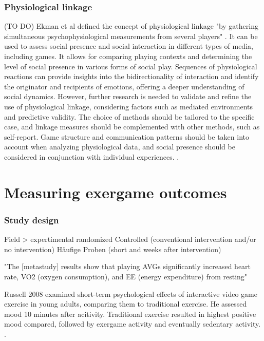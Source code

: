 \subsection{Physiological linkage} (TO DO)
Ekman et al defined the concept of physiological linkage "by gathering simultaneous psychophysiological measurements from several players" \cite{ekman2012social}. It can be used to assess social presence and social interaction in different types of media, including games. It allows for comparing playing contexts and determining the level of social presence in various forms of social play. Sequences of physiological reactions can provide insights into the bidirectionality of interaction and identify the originator and recipients of emotions, offering a deeper understanding of social dynamics. However, further research is needed to validate and refine the use of physiological linkage, considering factors such as mediated environments and predictive validity. The choice of methods should be tailored to the specific case, and linkage measures should be complemented with other methods, such as self-report. Game structure and communication patterns should be taken into account when analyzing physiological data, and social presence should be considered in conjunction with individual experiences. .


















\chapter{Measuring exergame outcomes}

\subsection{Study design}
Field > expertimental
randomized
Controlled (conventional intervention and/or no intervention)
Häufige Proben (short and weeks after intervention)


"The [metastudy] results show that playing AVGs significantly increased heart rate, VO2 (oxygen consumption), and EE (energy expenditure) from resting" \cite{peng2011playing}

Russell 2008 examined short-term psychological effects of interactive video game exercise in young adults, comparing them to traditional exercise. He assessed mood 10 minutes after acitivity. Traditional exercise resulted in highest positive mood compared, followed by exergame activity and eventually sedentary activity. \cite{russell2008short}.

